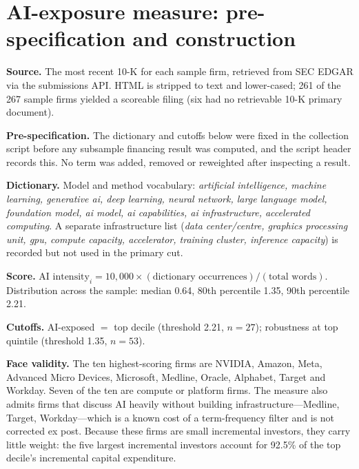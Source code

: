 \documentclass[preprint,11pt]{elsarticle}
\begin{document}
\section{AI-exposure measure: pre-specification and construction}\label{app:dict}
\textbf{Source.} The most recent 10-K for each sample firm, retrieved from SEC EDGAR via the
submissions API. HTML is stripped to text and lower-cased; 261 of the 267 sample firms yielded a
scoreable filing (six had no retrievable 10-K primary document).

\textbf{Pre-specification.} The dictionary and cutoffs below were fixed in the collection script
before any subsample financing result was computed, and the script header records this. No term was
added, removed or reweighted after inspecting a result.

\textbf{Dictionary.} Model and method vocabulary: \emph{artificial intelligence, machine learning,
generative ai, deep learning, neural network, large language model, foundation model, ai model, ai
capabilities, ai infrastructure, accelerated computing}. A separate infrastructure list (\emph{data
center/centre, graphics processing unit, gpu, compute capacity, accelerator, training cluster,
inference capacity}) is recorded but not used in the primary cut.

\textbf{Score.} $\text{AI intensity}_i = 10{,}000 \times (\text{dictionary occurrences}) /
(\text{total words})$. Distribution across the sample: median 0.64, 80th percentile 1.35, 90th
percentile 2.21.

\textbf{Cutoffs.} AI-exposed $=$ top decile (threshold 2.21, $n=27$); robustness at top quintile
(threshold 1.35, $n=53$).

\textbf{Face validity.} The ten highest-scoring firms are NVIDIA, Amazon, Meta, Advanced Micro
Devices, Microsoft, Medline, Oracle, Alphabet, Target and Workday. Seven of the ten are compute or
platform firms. The measure also admits firms that discuss AI heavily without building
infrastructure---Medline, Target, Workday---which is a known cost of a term-frequency filter and is
not corrected ex post. Because these firms are small incremental investors, they carry little weight:
the five largest incremental investors account for 92.5\% of the top decile's incremental capital
expenditure.
\end{document}

